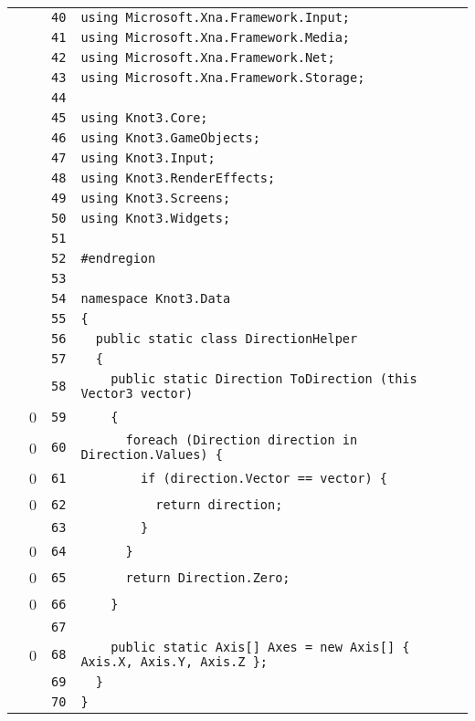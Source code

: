 \documentclass[a4paper,10pt]{article}
\begin{document}
\begin{longtable}[l]{lrrl}
\cellcolor{gray} &  & \verb~40~ & \verb~using Microsoft.Xna.Framework.Input;~\\
\cellcolor{gray} &  & \verb~41~ & \verb~using Microsoft.Xna.Framework.Media;~\\
\cellcolor{gray} &  & \verb~42~ & \verb~using Microsoft.Xna.Framework.Net;~\\
\cellcolor{gray} &  & \verb~43~ & \verb~using Microsoft.Xna.Framework.Storage;~\\
\cellcolor{gray} &  & \verb~44~ & \verb~~\\
\cellcolor{gray} &  & \verb~45~ & \verb~using Knot3.Core;~\\
\cellcolor{gray} &  & \verb~46~ & \verb~using Knot3.GameObjects;~\\
\cellcolor{gray} &  & \verb~47~ & \verb~using Knot3.Input;~\\
\cellcolor{gray} &  & \verb~48~ & \verb~using Knot3.RenderEffects;~\\
\cellcolor{gray} &  & \verb~49~ & \verb~using Knot3.Screens;~\\
\cellcolor{gray} &  & \verb~50~ & \verb~using Knot3.Widgets;~\\
\cellcolor{gray} &  & \verb~51~ & \verb~~\\
\cellcolor{gray} &  & \verb~52~ & \verb~#endregion~\\
\cellcolor{gray} &  & \verb~53~ & \verb~~\\
\cellcolor{gray} &  & \verb~54~ & \verb~namespace Knot3.Data~\\
\cellcolor{gray} &  & \verb~55~ & \verb~{~\\
\cellcolor{gray} &  & \verb~56~ & \verb~  public static class DirectionHelper~\\
\cellcolor{gray} &  & \verb~57~ & \verb~  {~\\
\cellcolor{gray} &  & \verb~58~ & \verb~    public static Direction ToDirection (this Vector3 vector)~\\
\cellcolor{red} & 0 & \verb~59~ & \verb~    {~\\
\cellcolor{red} & 0 & \verb~60~ & \verb~      foreach (Direction direction in Direction.Values) {~\\
\cellcolor{red} & 0 & \verb~61~ & \verb~        if (direction.Vector == vector) {~\\
\cellcolor{red} & 0 & \verb~62~ & \verb~          return direction;~\\
\cellcolor{gray} &  & \verb~63~ & \verb~        }~\\
\cellcolor{red} & 0 & \verb~64~ & \verb~      }~\\
\cellcolor{red} & 0 & \verb~65~ & \verb~      return Direction.Zero;~\\
\cellcolor{red} & 0 & \verb~66~ & \verb~    }~\\
\cellcolor{gray} &  & \verb~67~ & \verb~~\\
\cellcolor{red} & 0 & \verb~68~ & \verb~    public static Axis[] Axes = new Axis[] { Axis.X, Axis.Y, Axis.Z };~\\
\cellcolor{gray} &  & \verb~69~ & \verb~  }~\\
\cellcolor{gray} &  & \verb~70~ & \verb~}~\\
\end{longtable}
\newpage
\end{document}
